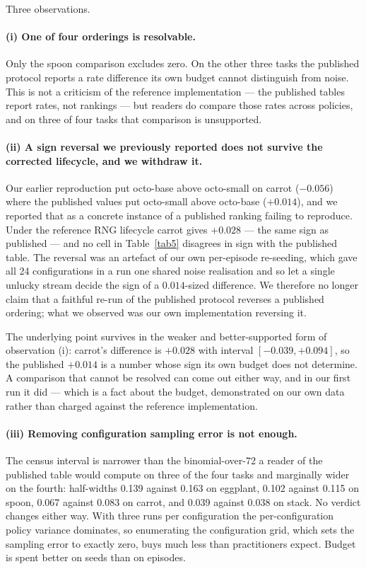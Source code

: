 \documentclass[pdflatex,iicol,sn-apa]{sn-jnl}
\theoremstyle{remark}
\begin{document}
Three observations.

\paragraph{(i) One of four orderings is resolvable.}
Only the spoon comparison excludes zero. On the other three tasks the published protocol reports a
rate difference its own budget cannot distinguish from noise. This is not a criticism of the
reference implementation --- the published tables report rates, not rankings --- but readers do
compare those rates across policies, and on three of four tasks that comparison is unsupported.

\paragraph{(ii) A sign reversal we previously reported does not survive the corrected lifecycle, and
we withdraw it.}
Our earlier reproduction put octo-base above octo-small on carrot ($-0.056$) where the published
values put octo-small above octo-base ($+0.014$), and we reported that as a concrete instance of a
published ranking failing to reproduce. Under the reference RNG lifecycle carrot gives $+0.028$ --- the
same sign as published --- and no cell in Table~\ref{tab5} disagrees in sign with the published
table. The reversal was an artefact of our own per-episode re-seeding, which gave all 24
configurations in a run one shared noise realisation and so let a single unlucky stream decide the
sign of a $0.014$-sized difference. We therefore no longer claim that a faithful re-run of the
published protocol reverses a published ordering; what we observed was our own implementation
reversing it.

The underlying point survives in the weaker and better-supported form of observation (i): carrot's
difference is $+0.028$ with interval $[-0.039, +0.094]$, so the published $+0.014$ is a number whose
sign its own budget does not determine. A comparison that cannot be resolved can come out either way,
and in our first run it did --- which is a fact about the budget, demonstrated on our own data rather
than charged against the reference implementation.

\paragraph{(iii) Removing configuration sampling error is not enough.}
The census interval is narrower than the binomial-over-72 a reader of the published table would
compute on three of the four tasks and marginally wider on the fourth: half-widths 0.139 against
0.163 on eggplant, 0.102 against 0.115 on spoon, 0.067 against 0.083 on carrot, and 0.039 against
0.038 on stack. No verdict changes either way. With three runs per configuration the
per-configuration policy variance dominates, so enumerating the configuration grid, which sets the
sampling error to exactly zero, buys much less than practitioners expect. Budget is spent better on
seeds than on episodes.
\end{document}

